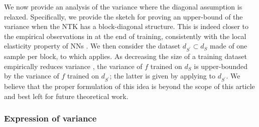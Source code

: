 We now provide an analysis of the variance where the diagonal assumption is relaxed.
Specifically, we provide the sketch for proving an upper-bound of the variance when the NTK has a block-diagonal structure.
This is indeed closer to the empirical observations in \cite{seleznova2022neural} at the end of training, consistently with the local elasticity property of NNs \cite{He2020The}.
We then consider the dataset $d_{S^\prime} \subset d_S$ made of one sample per block, to which  applies.
As decreasing the size of a training dataset empirically reduces variance \cite{brain1999effect}, the variance of $f$ trained on $d_S$ is upper-bounded by the variance of $f$ trained on $d_{S^\prime}$; the latter is given by applying  to $d_{S^\prime}$.
We believe that the proper formulation of this idea is beyond the scope of this article and best left for future theoretical work.

\subsubsection{Expression of \ood variance}
\label{app:proof_ood_var}

